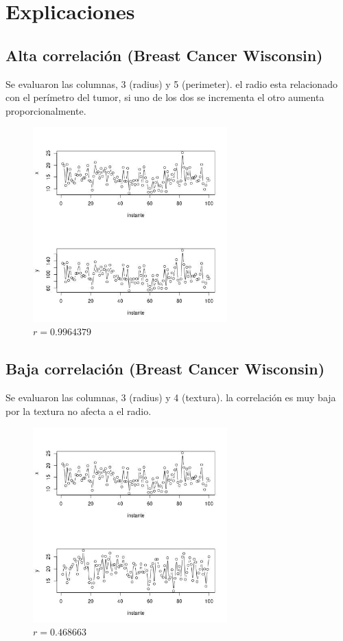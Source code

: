 \documentclass[12pt]{article}
\begin{document}
\section*{Explicaciones}
\label{sec:org3809fa3}
\subsection*{Alta correlación (Breast Cancer Wisconsin)}
\label{sec:org6ec7d5b}
Se evaluaron las columnas, 3 (radius) y 5 (perimeter). el radio esta 
relacionado con el perímetro del tumor, si uno de los dos se incrementa
el otro aumenta proporcionalmente.

\begin{figure}[htbp]
\centering
\includegraphics[width=7.5cm]{img/alta_coorelacion.jpeg}
\caption{\(r = 0.9964379\)}
\end{figure}

\pagebreak

\subsection*{Baja correlación (Breast Cancer Wisconsin)}
\label{sec:org817a66d}
Se evaluaron las columnas, 3 (radius) y 4 (textura). la correlación es muy
baja por la textura no afecta a el radio.

\begin{figure}[htbp]
\centering
\includegraphics[width=7.5cm]{img/baja_corelacion.jpeg}
\caption{\(r=0.468663\)}
\end{figure}
\end{document}
